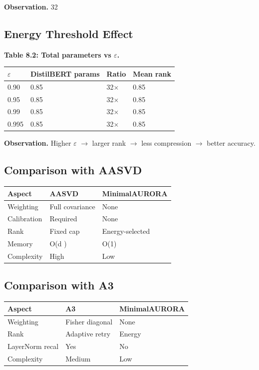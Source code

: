 \textbf{Observation.} 32

\subsection{Energy Threshold Effect}

\textbf{Table 8.2: Total parameters vs $\varepsilon$.}

\begin{table}[H]
\centering
\small
\begin{tabular}{llll}
\toprule
\textbf{$\varepsilon$} & \textbf{DistilBERT params} & \textbf{Ratio} & \textbf{Mean rank} \\
\midrule
0.90 & 0.85 & 32$\times$ & 0.85 \\
0.95 & 0.85 & 32$\times$ & 0.85 \\
0.99 & 0.85 & 32$\times$ & 0.85 \\
0.995 & 0.85 & 32$\times$ & 0.85 \\
\bottomrule
\end{tabular}
\end{table}

\textbf{Observation.} Higher $\varepsilon$ $\to$ larger rank $\to$ less compression $\to$ 
better accuracy.

\subsection{Comparison with AASVD}

\begin{table}[H]
\centering
\small
\begin{tabular}{lll}
\toprule
\textbf{Aspect} & \textbf{AASVD} & \textbf{MinimalAURORA} \\
\midrule
Weighting & Full covariance & None \\
Calibration & Required & None \\
Rank & Fixed cap & Energy-selected \\
Memory & O(d ) & O(1) \\
Complexity & High & Low \\
\bottomrule
\end{tabular}
\end{table}

\subsection{Comparison with A3}

\begin{table}[H]
\centering
\small
\begin{tabular}{lll}
\toprule
\textbf{Aspect} & \textbf{A3} & \textbf{MinimalAURORA} \\
\midrule
Weighting & Fisher diagonal & None \\
Rank & Adaptive retry & Energy \\
LayerNorm recal & Yes & No \\
Complexity & Medium & Low \\
\bottomrule
\end{tabular}
\end{table}


